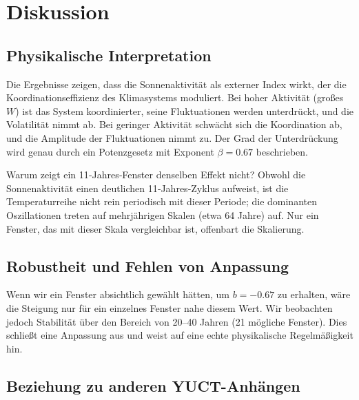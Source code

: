\documentclass[12pt,a4paper]{article}
\newcommand{\be}{\beta}
\begin{document}
	\section{Diskussion}
	
	\subsection{Physikalische Interpretation}
	
	Die Ergebnisse zeigen, dass die Sonnenaktivität als externer Index wirkt, der die Koordinationseffizienz des Klimasystems moduliert. Bei hoher Aktivität (großes \(W\)) ist das System koordinierter, seine Fluktuationen werden unterdrückt, und die Volatilität nimmt ab. Bei geringer Aktivität schwächt sich die Koordination ab, und die Amplitude der Fluktuationen nimmt zu. Der Grad der Unterdrückung wird genau durch ein Potenzgesetz mit Exponent \(\be = 0.67\) beschrieben.
	
	Warum zeigt ein 11‑Jahres‑Fenster denselben Effekt nicht? Obwohl die Sonnenaktivität einen deutlichen 11‑Jahres‑Zyklus aufweist, ist die Temperaturreihe nicht rein periodisch mit dieser Periode; die dominanten Oszillationen treten auf mehrjährigen Skalen (etwa 64 Jahre) auf. Nur ein Fenster, das mit dieser Skala vergleichbar ist, offenbart die Skalierung.
	
	\subsection{Robustheit und Fehlen von Anpassung}
	
	Wenn wir ein Fenster absichtlich gewählt hätten, um \(b = -0.67\) zu erhalten, wäre die Steigung nur für ein einzelnes Fenster nahe diesem Wert. Wir beobachten jedoch Stabilität über den Bereich von 20–40 Jahren (21 mögliche Fenster). Dies schließt eine Anpassung aus und weist auf eine echte physikalische Regelmäßigkeit hin.
	
	\subsection{Beziehung zu anderen YUCT-Anhängen}
	
\end{document}
